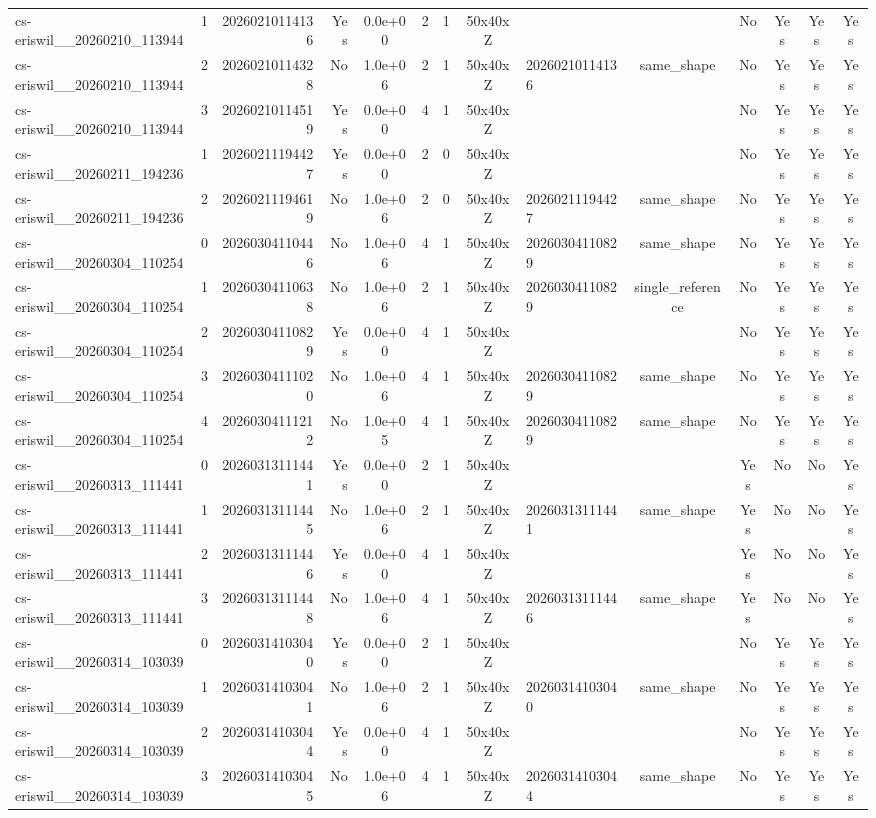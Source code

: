 \begin{table}[t]
{\begin{tabular}{lrrrcccclccccc}
cs-eriswil\_\_20260210\_113944 & 1 & 20260210114136 & Yes & 0.0e+00 & 2 & 1 & 50x40xZ &  &  & No & Yes & Yes & Yes \\
cs-eriswil\_\_20260210\_113944 & 2 & 20260210114328 & No & 1.0e+06 & 2 & 1 & 50x40xZ & 20260210114136 & same\_shape & No & Yes & Yes & Yes \\
cs-eriswil\_\_20260210\_113944 & 3 & 20260210114519 & Yes & 0.0e+00 & 4 & 1 & 50x40xZ &  &  & No & Yes & Yes & Yes \\
cs-eriswil\_\_20260211\_194236 & 1 & 20260211194427 & Yes & 0.0e+00 & 2 & 0 & 50x40xZ &  &  & No & Yes & Yes & Yes \\
cs-eriswil\_\_20260211\_194236 & 2 & 20260211194619 & No & 1.0e+06 & 2 & 0 & 50x40xZ & 20260211194427 & same\_shape & No & Yes & Yes & Yes \\
cs-eriswil\_\_20260304\_110254 & 0 & 20260304110446 & No & 1.0e+06 & 4 & 1 & 50x40xZ & 20260304110829 & same\_shape & No & Yes & Yes & Yes \\
cs-eriswil\_\_20260304\_110254 & 1 & 20260304110638 & No & 1.0e+06 & 2 & 1 & 50x40xZ & 20260304110829 & single\_reference & No & Yes & Yes & Yes \\
cs-eriswil\_\_20260304\_110254 & 2 & 20260304110829 & Yes & 0.0e+00 & 4 & 1 & 50x40xZ &  &  & No & Yes & Yes & Yes \\
cs-eriswil\_\_20260304\_110254 & 3 & 20260304111020 & No & 1.0e+06 & 4 & 1 & 50x40xZ & 20260304110829 & same\_shape & No & Yes & Yes & Yes \\
cs-eriswil\_\_20260304\_110254 & 4 & 20260304111212 & No & 1.0e+05 & 4 & 1 & 50x40xZ & 20260304110829 & same\_shape & No & Yes & Yes & Yes \\
cs-eriswil\_\_20260313\_111441 & 0 & 20260313111441 & Yes & 0.0e+00 & 2 & 1 & 50x40xZ &  &  & Yes & No & No & Yes \\
cs-eriswil\_\_20260313\_111441 & 1 & 20260313111445 & No & 1.0e+06 & 2 & 1 & 50x40xZ & 20260313111441 & same\_shape & Yes & No & No & Yes \\
cs-eriswil\_\_20260313\_111441 & 2 & 20260313111446 & Yes & 0.0e+00 & 4 & 1 & 50x40xZ &  &  & Yes & No & No & Yes \\
cs-eriswil\_\_20260313\_111441 & 3 & 20260313111448 & No & 1.0e+06 & 4 & 1 & 50x40xZ & 20260313111446 & same\_shape & Yes & No & No & Yes \\
cs-eriswil\_\_20260314\_103039 & 0 & 20260314103040 & Yes & 0.0e+00 & 2 & 1 & 50x40xZ &  &  & No & Yes & Yes & Yes \\
cs-eriswil\_\_20260314\_103039 & 1 & 20260314103041 & No & 1.0e+06 & 2 & 1 & 50x40xZ & 20260314103040 & same\_shape & No & Yes & Yes & Yes \\
cs-eriswil\_\_20260314\_103039 & 2 & 20260314103044 & Yes & 0.0e+00 & 4 & 1 & 50x40xZ &  &  & No & Yes & Yes & Yes \\
cs-eriswil\_\_20260314\_103039 & 3 & 20260314103045 & No & 1.0e+06 & 4 & 1 & 50x40xZ & 20260314103044 & same\_shape & No & Yes & Yes & Yes \\
\hline
\end{tabular}
}
\end{table}
